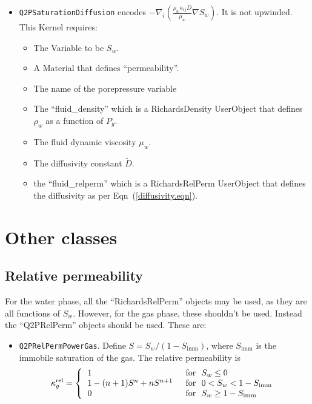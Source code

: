\documentclass[]{scrreprt}
\begin{document}
\begin{itemize}
\item {\tt Q2PSaturationDiffusion} encodes $- \nabla_{i}\left(
\frac{\rho_{w}\kappa_{ij}D}{\mu_{w}} \nabla S_{w} \right)$.  It is not
upwinded.  This Kernel requires:
\begin{itemize}
\item The Variable to be $S_{w}$.
\item A Material that defines ``permeability''.
\item The name of the porepressure variable
\item The ``fluid\_density'' which is a RichardsDensity
  UserObject that defines $\rho_{w}$ as a function of $P_{g}$.
\item The fluid dynamic viscosity $\mu_{w}$.
\item The diffusivity constant $\tilde{D}$.
\item the ``fluid\_relperm'' which is a RichardsRelPerm UserObject
  that defines the diffusivity as per Eqn~(\ref{diffusivity.eqn}).
\end{itemize}

\end{itemize}


\section{Other classes}

\subsection{Relative permeability}

For the water phase, all the ``RichardsRelPerm'' objects may be
used, as they are all functions of $S_{w}$.  However, for the gas
phase, these shouldn't be used.  Instead the ``Q2PRelPerm'' objects
should be used.  These are:

\begin{itemize}
\item {\tt Q2PRelPermPowerGas}.  Define $S = S_{w}/(1 -
  S_{\mathrm{imm}})$, where $S_{\mathrm{imm}}$ is the immobile
  saturation of the gas.  The relative permeability is
\begin{equation}
\kappa_{g}^{\mathrm{rel}} = \left\{
\begin{tabular}{ll}
1 & \mbox{ for } $S_{w} \leq 0$ \\
$1 - (n+1)S^{n} + nS^{n+1}$ & \mbox{ for } $0 < S_{w} < 1 -
S_{\mathrm{imm}}$ \\
0 & \mbox{ for } $S_{w} \geq 1 - S_{\mathrm{imm}}$ \\
\end{tabular}
\right.
\end{equation}

\end{itemize}
\end{document}
